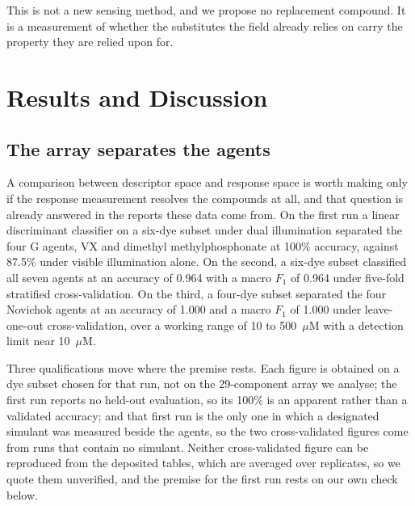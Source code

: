 \documentclass[journal=jacsat,manuscript=article,margin=1in]{achemso}
\begin{document}
This is not a new sensing method, and we propose no replacement compound.
It is a measurement of whether the substitutes the field already relies on
carry the property they are relied upon for.

\section{Results and Discussion}

\subsection{The array separates the agents}
\label{res:premise}

A comparison between descriptor space and response space is worth making only
if the response measurement resolves the compounds at all, and that question is
already answered in the reports these data come from. On the first run a linear
discriminant classifier on a six-dye subset under dual illumination separated
the four G agents, VX and dimethyl methylphosphonate at 100\% accuracy, against
87.5\% under visible illumination alone.\cite{hazref} On the second, a six-dye
subset classified all seven agents at an accuracy of 0.964 with a macro $F_1$
of 0.964 under five-fold stratified cross-validation.\cite{multiplexref} On the
third, a four-dye subset separated the four Novichok agents at an accuracy of
1.000 and a macro $F_1$ of 1.000 under leave-one-out cross-validation, over a
working range
of 10 to 500~$\mu$M with a detection limit near 10~$\mu$M.\cite{group3ref}

Three qualifications move where the premise rests. Each figure is obtained on
a dye subset chosen for that run, not on the 29-component array we analyse;
the first run reports no held-out evaluation, so its 100\% is an apparent
rather than a validated accuracy; and that first run is the only one in which
a designated simulant was measured beside the agents, so the two
cross-validated figures come from runs that contain no simulant. Neither
cross-validated figure can be reproduced from the deposited tables, which are
averaged over replicates, so we quote them unverified, and the premise for the
first run rests on our own check below.
\end{document}

